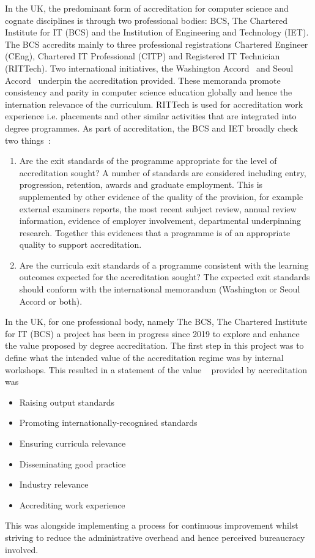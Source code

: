 \documentclass[conference]{IEEEtran}
\begin{document}
In the UK, the predominant form of accreditation for computer science
and cognate disciplines is through two professional bodies: BCS, The
Chartered Institute for IT (BCS) and the Institution of Engineering
and Technology (IET). The BCS accredits mainly to three professional registrations Chartered Engineer (CEng), Chartered IT Professional (CITP) and Registered IT Technician (RITTech). Two international initiatives, the Washington
Accord~\cite[for CEng]{Washington2022} and Seoul Accord~\cite[for
CITP]{Seoul2022} underpin the accreditation provided. These memoranda promote consistency and parity in computer science education globally and hence the internation relevance of the curriculum. RITTech is used for accreditation work experience i.e. placements and other similar activities that are integrated into degree programmes. As part of accreditation, the BCS and IET broadly check two things~\cite{BCS2020, IET2022}:
\begin{enumerate}
			\item Are the exit standards of the programme appropriate for the
			level of accreditation sought?  A number of standards are considered
			including entry, progression, retention, awards and graduate
			employment.  This is supplemented by other evidence of the quality
			of the provision, for example external examiners reports, the most
			recent subject review, annual review information, evidence of employer
			involvement, departmental underpinning research. Together this evidences that a
			programme is of an appropriate quality to support accreditation.
			\item Are the curricula exit standards of a programme consistent
			with the learning outcomes expected for the accreditation sought? The
			expected exit standards should conform with the international
			memorandum (Washington or Seoul Accord or both).
\end{enumerate}

In the UK, for one professional body, namely The BCS, The Chartered Institute for IT (BCS) a project has been in progress since 2019 to explore and enhance the value proposed by degree accreditation. The first step in this project was to define what the intended value of the accreditation regime was by internal workshops. This resulted in a statement of the value ~\cite{crick-et-al-accred:cep2020,itnowaccred:2020} provided by accreditation was 
\begin{itemize}
	\item Raising output standards
	\item Promoting internationally-recognised standards
	\item Ensuring curricula relevance
	\item Disseminating good practice
	\item Industry relevance
	\item Accrediting work experience
\end{itemize}
This was alongside implementing a process for continuous improvement whilst striving to reduce the administrative overhead and hence perceived bureaucracy involved.
\end{document}
